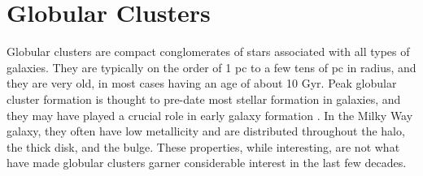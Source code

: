\section{Globular Clusters}

Globular clusters are compact conglomerates of stars associated with all types of galaxies. They are typically on the order of 1 pc to a few tens of pc in radius, and they are very old, in most cases having an age of about 10 Gyr. Peak globular cluster formation is thought to pre-date most stellar formation in galaxies, and they may have played a crucial role in early galaxy formation \cite{Gratton2019}. In the Milky Way galaxy, they often have low metallicity and are distributed throughout the halo, the thick disk, and the bulge. These properties, while interesting, are not what have made globular clusters garner considerable interest in the last few decades.

